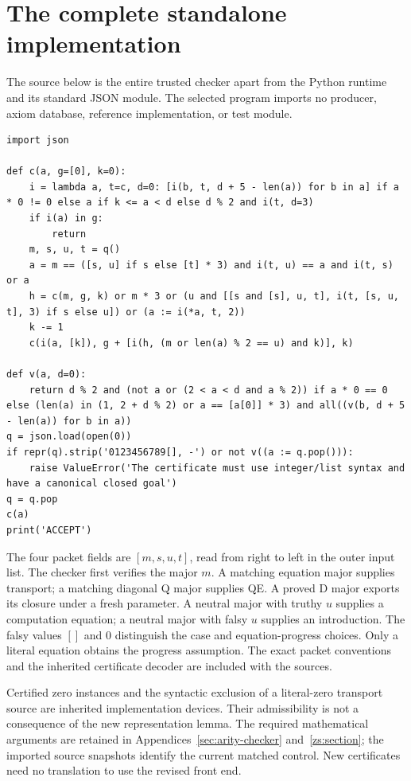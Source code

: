 \documentclass[11pt,letterpaper]{article}
\theoremstyle{definition}
\theoremstyle{remark}
\begin{document}
\section{The complete standalone implementation}
\label{sec:implementation}
The source below is the entire trusted checker apart from the Python runtime
and its standard JSON module. The selected program imports no producer,
axiom database, reference implementation, or test module.
\begin{lstlisting}
import json

def c(a, g=[0], k=0):
    i = lambda a, t=c, d=0: [i(b, t, d + 5 - len(a)) for b in a] if a * 0 != 0 else a if k <= a < d else d % 2 and i(t, d=3)
    if i(a) in g:
        return
    m, s, u, t = q()
    a = m == ([s, u] if s else [t] * 3) and i(t, u) == a and i(t, s) or a
    h = c(m, g, k) or m * 3 or (u and [[s and [s], u, t], i(t, [s, u, t], 3) if s else u]) or (a := i(*a, t, 2))
    k -= 1
    c(i(a, [k]), g + [i(h, (m or len(a) % 2 == u) and k)], k)

def v(a, d=0):
    return d % 2 and (not a or (2 < a < d and a % 2)) if a * 0 == 0 else (len(a) in (1, 2 + d % 2) or a == [a[0]] * 3) and all((v(b, d + 5 - len(a)) for b in a))
q = json.load(open(0))
if repr(q).strip('0123456789[], -') or not v((a := q.pop())):
    raise ValueError('The certificate must use integer/list syntax and have a canonical closed goal')
q = q.pop
c(a)
print('ACCEPT')
\end{lstlisting}

The four packet fields are $[m,s,u,t]$, read from right to left in the outer
input list. The checker first verifies the major $m$. A matching equation
major supplies transport; a matching diagonal Q major supplies QE. A
proved D major exports its closure under a fresh parameter. A neutral major
with truthy $u$ supplies a computation equation; a neutral major with falsy
$u$ supplies an introduction. The falsy values $[]$ and $0$ distinguish the
case and equation-progress choices. Only a literal equation obtains the
progress assumption. The exact packet conventions and the inherited
certificate decoder are included with the sources.

Certified zero instances and the syntactic exclusion of a literal-zero
transport source are inherited implementation devices. Their admissibility
is not a consequence of the new representation lemma. The required
mathematical arguments are retained in
Appendices~\ref{sec:arity-checker} and~\ref{zs:section}; the imported
source snapshots identify the current matched control. New certificates
need no translation to use the revised front end.
\end{document}
